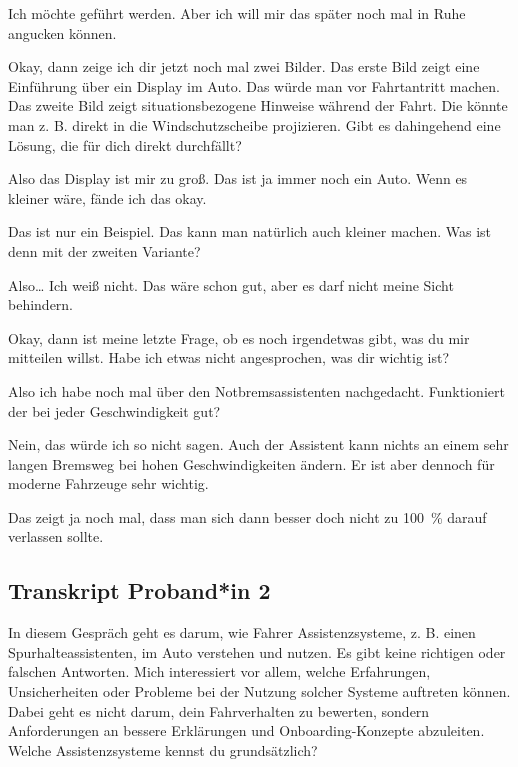 Ich möchte geführt werden. Aber ich will mir das später noch mal in
Ruhe angucken können.

\interviewerin
Okay, dann zeige ich dir jetzt noch mal zwei Bilder. Das erste Bild
zeigt eine Einführung über ein Display im Auto. Das würde man vor
Fahrtantritt machen. Das zweite Bild zeigt situationsbezogene Hinweise
während der Fahrt. Die könnte man z. B. direkt in die Windschutzscheibe
projizieren. Gibt es dahingehend eine Lösung, die für dich direkt
durchfällt?

Also das Display ist mir zu groß. Das ist ja immer noch ein Auto. Wenn
es kleiner wäre, fände ich das okay.

\interviewerin
Das ist nur ein Beispiel. Das kann man natürlich auch kleiner machen.
Was ist denn mit der zweiten Variante?

Also… Ich weiß nicht. Das wäre schon gut, aber es darf nicht meine
Sicht behindern.

\interviewerin
Okay, dann ist meine letzte Frage, ob es noch irgendetwas gibt, was du
mir mitteilen willst. Habe ich etwas nicht angesprochen, was dir
wichtig ist?

Also ich habe noch mal über den Notbremsassistenten nachgedacht.
Funktioniert der bei jeder Geschwindigkeit gut?

\interviewerin
Nein, das würde ich so nicht sagen. Auch der Assistent kann nichts an
einem sehr langen Bremsweg bei hohen Geschwindigkeiten ändern. Er ist
aber dennoch für moderne Fahrzeuge sehr wichtig.

Das zeigt ja noch mal, dass man sich dann besser doch nicht zu
100~\% darauf verlassen sollte.



\clearpage
\subsection{Transkript Proband*in 2}
\label{subsec:transkript-p2}

\interviewerin
In diesem Gespräch geht es darum, wie Fahrer Assistenzsysteme, z. B.
einen Spurhalteassistenten, im Auto verstehen und nutzen. Es gibt keine
richtigen oder falschen Antworten. Mich interessiert vor allem, welche
Erfahrungen, Unsicherheiten oder Probleme bei der Nutzung solcher
Systeme auftreten können. Dabei geht es nicht darum, dein Fahrverhalten
zu bewerten, sondern Anforderungen an bessere Erklärungen und
Onboarding-Konzepte abzuleiten. Welche Assistenzsysteme kennst du
grundsätzlich?


